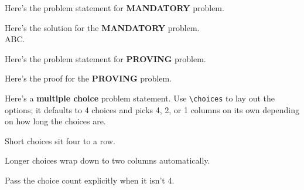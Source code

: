 \documentclass[a4paper, 10pt]{article}
\begin{document}
\begin{problem}
Here's the problem statement for \textbf{MANDATORY} problem.
\end{problem}

\begin{tosubmit}
	Here's the solution for the \textbf{MANDATORY} problem. \\
	ABC.
\end{tosubmit}

\begin{problem}
Here's the problem statement for \textbf{PROVING} problem.
\end{problem}

\begin{proofbox}
	Here's the proof for the \textbf{PROVING} problem.
\end{proofbox}

\begin{problem}
Here's a \textbf{multiple choice} problem statement. Use \verb|\choices| to lay
out the options; it defaults to 4 choices and picks 4, 2, or 1 columns on its
own depending on how long the choices are.
\begin{subproblems}
	\item Short choices sit four to a row.
	\item Longer choices wrap down to two columns automatically.
	\item Pass the choice count explicitly when it isn't 4.
\end{subproblems}
\end{problem}
\end{document}
